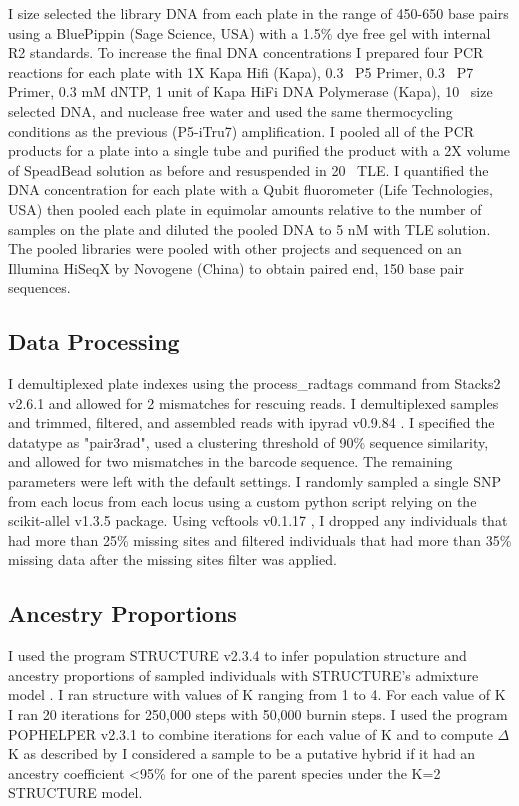 I size selected the library DNA from each plate in the range of 450-650 base pairs using
a BluePippin (Sage Science, USA) with a 1.5\% dye free gel with internal R2 standards. 
To increase the final DNA concentrations I prepared four PCR reactions for each 
plate with 1X Kapa Hifi (Kapa), 0.3 \uM\ P5 Primer, 0.3 \uM\ P7 Primer, 0.3 mM dNTP, 
1 unit of Kapa HiFi DNA Polymerase (Kapa), 10 \uL\ size selected DNA, and 
nuclease free water and used the same thermocycling conditions as the previous
(P5-iTru7) amplification.
I pooled all of the PCR products for a plate into a single tube and purified 
the product with a 2X volume of SpeadBead solution as before and resuspended in 20 \uL\ TLE. 
I quantified the DNA concentration for each plate with a Qubit fluorometer 
(Life Technologies, USA) then pooled each plate in equimolar amounts relative 
to the number of samples on the plate and diluted the pooled DNA to 5 nM with
TLE solution. 
The pooled libraries were pooled with other projects and sequenced on an Illumina 
HiSeqX by Novogene (China) to obtain paired end, 150 base pair sequences. 

\subsection{Data Processing}

I demultiplexed plate indexes using the process\_radtags command from 
Stacks2 v2.6.1 \parencite{rochette2019} and allowed for 2 mismatches for rescuing reads. 
I demultiplexed samples and trimmed, filtered, and assembled reads with 
ipyrad v0.9.84 \parencite{eaton2020}. I specified the datatype as "pair3rad", 
used a clustering threshold of 90\% sequence similarity, and allowed for two  
mismatches in the barcode sequence. The remaining parameters were left with the 
default settings.
I randomly sampled a single SNP from each locus from each locus using a  
custom python script relying on the scikit-allel v1.3.5 package.
Using vcftools v0.1.17 \parencite{danecek2011}, I dropped any individuals that 
had more than 25\% missing sites and filtered individuals that had more than 
35\% missing data after the missing sites filter was applied. 

\subsection{Ancestry Proportions}
I used the program STRUCTURE v2.3.4 \parencite{pritchard2000} to infer population structure and ancestry 
proportions of sampled individuals with STRUCTURE's admixture model .
I ran structure with values of K ranging from 1 to 4. For each value of K I 
ran 20 iterations for 250,000 steps with 50,000 burnin steps. 
I used the program POPHELPER v2.3.1 \parencite{francis2017} to combine
iterations for each value of K and to compute $\Delta$K as described by \parencite{evanno2005}
I considered a sample to be a putative hybrid if it had an ancestry coefficient
<95\% for one of the parent species under the K=2 STRUCTURE model.


